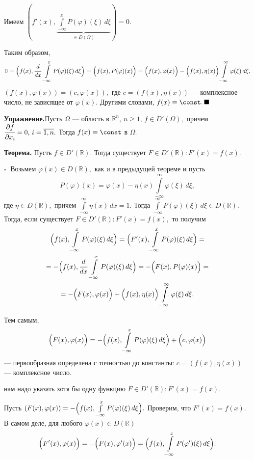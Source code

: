 \documentclass[unicode,12pt,draft]{article}
\begin{document}
Имеем $(f'(x),\underbrace{\int\limits_{-\infty}^x P(\varphi)(\xi)
\,d\xi}_{\in D(\Omega)})=0$.

Таким образом, $$0=\Bigl(f(x),\cfrac d{dx}\,\int\limits_{-\infty}^x
P(\varphi)(\xi)\,d\xi\Bigr)
=\Bigl(f(x),P(\varphi)(x)\Bigr)=\Bigl(f(x),\varphi(x)\Bigr)-\Bigl(f(x),\eta(x)\Bigr)\int\limits_{-\infty}^{\infty}\varphi(\xi)
\,d\xi,$$
$(f(x),\varphi(x))=(c,\varphi(x)),$ где $c=(f(x),\eta(x))$ ---
комплексное число, не зависящее от $\varphi(x).$ Другими словами,
$f(x)\equiv \const  . \,\blacksquare$

\textbf{Упражнение.}Пусть $\Omega$ --- область в $\mathbb
R^n,\,n\ge1,\,f\in D'(\Omega),$ причем $\cfrac{\partial
f}{\partial x_i}=0,\, i=\overline{1,n}.$ Тогда $f(x)\equiv \const
$ в $\Omega$.

\textbf{Теорема.} Пусть $f\in D'(\mathbb R).$ Тогда существует
$F\in D'(\mathbb R)\colon F'(x)=f(x).$

$\square\;$
Возьмем $\varphi(x)\in D(\mathbb R),$ как и в предыдущей теореме и
пусть
$$P(\varphi)(x)=\varphi(x)-\eta(x)\int\limits_{-\infty}^{\infty}\varphi(\xi)
\,d\xi,$$
где $\eta\in D(\mathbb R),$ причем
$\int\limits_{-\infty}^{\infty}\eta(x)\,dx=1.$ Тогда
$\int\limits_{-\infty}^{\infty}P(\varphi)(\xi)\,d\xi \in D(\mathbb
R).$ Тогда, если существует $F\in D'(\mathbb R)\colon F'(x)=f(x),$
то получим
\begin{multline}
\Bigl(f(x),\int\limits_{-\infty}^x
P(\varphi)(\xi)\,d\xi\Bigr) =\Bigl(F'(x),\int\limits_{-\infty}^x
P(\varphi)(\xi)\,d\xi\Bigr) =\\=
-\Bigl(f(x),\cfrac
d{dx}\,\int\limits_{-\infty}^x P(\varphi)
(\xi)\,d\xi\Bigr)=-\Bigl(F(x),P(\varphi)(x)\Bigr)=\\=
-\Bigl(F(x),\varphi(x)\Bigr)+\Bigl(f(x),\eta(x)\Bigr)\int\limits_{-\infty}^{\infty}\varphi(\xi)\,d\xi.
\end{multline}

Тем самым,
$$\Bigl(F(x),\varphi(x)\Bigr)=-\Bigl(f(x),\int\limits_{-\infty}^x
P(\varphi)(\xi)\,d\xi\Bigr)+\Bigl(c,\varphi(x)\Bigr)$$
 --- первообразная определена с точностью до константы:
$c=(f(x),\eta(x))$
--- комплексное число.

нам надо указать хотя бы одну функцию $F\in D'(\mathbb R)\colon
F'(x)=f(x).$

Пусть $(F(x),\varphi(x))=-\Bigl(f(x),\int\limits_{-\infty}^x
P(\varphi)(\xi)\,d\xi\Bigr).$ Проверим, что $F'(x)=f(x).$ В самом
деле, для любого $\varphi(x)\in D(\mathbb R)$
$$\Bigl(F'(x),\varphi(x)\Bigr)=-\Bigl(F(x),\varphi'(x)\Bigr)=\Bigl(f(x),\int\limits_{-\infty}^x
P(\varphi')(\xi)\,d\xi\Bigr).$$
\end{document}

